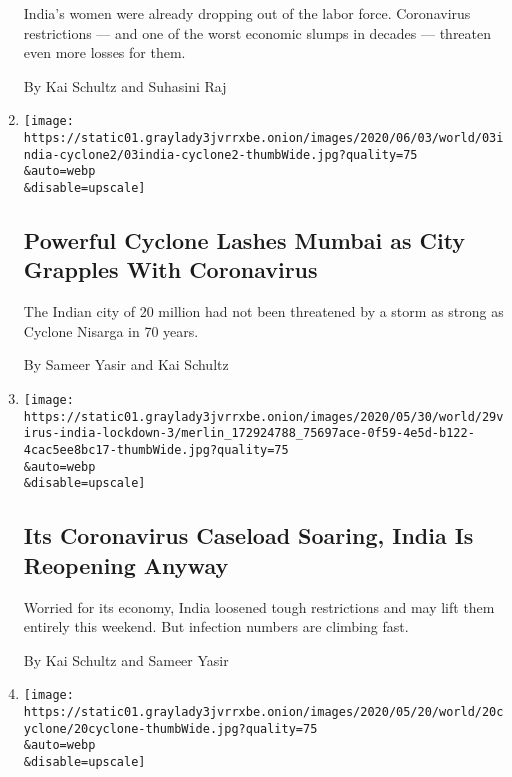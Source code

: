 \begin{enumerate}
  India's women were already dropping out of the labor force.
  Coronavirus restrictions --- and one of the worst economic slumps in
  decades --- threaten even more losses for them.

  By Kai Schultz and Suhasini Raj
\item
  \href{/2020/06/03/world/asia/cyclone-nisarga-india-mumbai.html}{}

  \texttt{[image: https://static01.graylady3jvrrxbe.onion/images/2020/06/03/world/03india-cyclone2/03india-cyclone2-thumbWide.jpg?quality=75\\\&auto=webp\\\&disable=upscale]}

  \hypertarget{powerful-cyclone-lashes-mumbai-as-city-grapples-with-coronavirus}{%
  \subsection{Powerful Cyclone Lashes Mumbai as City Grapples With
  Coronavirus}\label{powerful-cyclone-lashes-mumbai-as-city-grapples-with-coronavirus}}

  The Indian city of 20 million had not been threatened by a storm as
  strong as Cyclone Nisarga in 70 years.

  By Sameer Yasir and Kai Schultz
\item
  \href{/2020/05/29/world/asia/coronavirus-india-lockdown.html}{}

  \texttt{[image: https://static01.graylady3jvrrxbe.onion/images/2020/05/30/world/29virus-india-lockdown-3/merlin\_172924788\_75697ace-0f59-4e5d-b122-4cac5ee8bc17-thumbWide.jpg?quality=75\\\&auto=webp\\\&disable=upscale]}

  \hypertarget{its-coronavirus-caseload-soaring-india-is-reopening-anyway}{%
  \subsection{Its Coronavirus Caseload Soaring, India Is Reopening
  Anyway}\label{its-coronavirus-caseload-soaring-india-is-reopening-anyway}}

  Worried for its economy, India loosened tough restrictions and may
  lift them entirely this weekend. But infection numbers are climbing
  fast.

  By Kai Schultz and Sameer Yasir
\item
  \href{/2020/05/20/world/asia/cyclone-amphan-india-bangladesh.html}{}

  \texttt{[image: https://static01.graylady3jvrrxbe.onion/images/2020/05/20/world/20cyclone/20cyclone-thumbWide.jpg?quality=75\\\&auto=webp\\\&disable=upscale]}


\end{enumerate}
